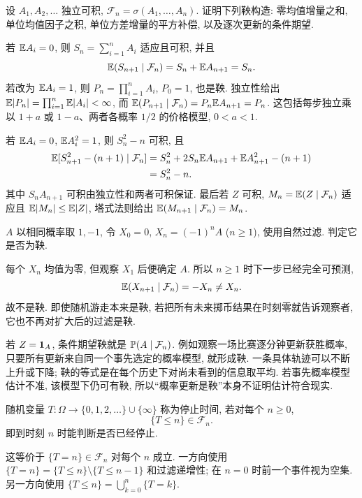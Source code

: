 \begin{example}
设 $A_1,A_2,\ldots$ 独立可积, $\mathcal F_n=\sigma(A_1,\ldots,A_n)$. 证明下列鞅构造: 零均值增量之和, 单位均值因子之积, 单位方差增量的平方补偿, 以及逐次更新的条件期望.
\end{example}
\begin{solution}
若 $\mathbb E A_i=0$, 则 $S_n=\sum_{i=1}^nA_i$ 适应且可积, 并且
\[
 \mathbb E(S_{n+1}\mid\mathcal F_n)=S_n+\mathbb E A_{n+1}=S_n.
\]
若改为 $\mathbb E A_i=1$, 则 $P_n=\prod_{i=1}^nA_i$, $P_0=1$, 也是鞅. 独立性给出 $\mathbb E|P_n|=\prod_{i=1}^n\mathbb E|A_i|<\infty$, 而
$\mathbb E(P_{n+1}\mid\mathcal F_n)=P_n\mathbb E A_{n+1}=P_n$.
这包括每步独立乘以 $1+a$ 或 $1-a$、两者各概率 $1/2$ 的价格模型, $0<a<1$.

若 $\mathbb E A_i=0$, $\mathbb E A_i^2=1$, 则 $S_n^2-n$ 可积, 且
\begin{align*}
 \mathbb E[S_{n+1}^2-(n+1)\mid\mathcal F_n]
 &=S_n^2+2S_n\mathbb E A_{n+1}+\mathbb E A_{n+1}^2-(n+1)\\
 &=S_n^2-n.
\end{align*}
其中 $S_nA_{n+1}$ 可积由独立性和两者可积保证. 最后若 $Z$ 可积, $M_n=\mathbb E(Z\mid\mathcal F_n)$ 适应且
$\mathbb E|M_n|\leq\mathbb E|Z|$, 塔式法则给出
$\mathbb E(M_{n+1}\mid\mathcal F_n)=M_n$.
\end{solution}

\begin{example}
$A$ 以相同概率取 $1,-1$, 令 $X_0=0$, $X_n=(-1)^nA$ ($n\geq1$), 使用自然过滤. 判定它是否为鞅.
\end{example}
\begin{solution}
每个 $X_n$ 均值为零, 但观察 $X_1$ 后便确定 $A$. 所以 $n\geq1$ 时下一步已经完全可预测,
\[
 \mathbb E(X_{n+1}\mid\mathcal F_n)=-X_n\ne X_n.
\]
故不是鞅. 即使随机游走本来是鞅, 若把所有未来掷币结果在时刻零就告诉观察者, 它也不再对扩大后的过滤是鞅.
\end{solution}

若 $Z=\mathbf 1_A$, 条件期望鞅就是 $\mathbb P(A\mid\mathcal F_n)$. 例如观察一场比赛逐分钟更新获胜概率, 只要所有更新来自同一个事先选定的概率模型, 就形成鞅. 一条具体轨迹可以不断上升或下降; 鞅的等式是在每个历史下对尚未看到的信息取平均. 若事先概率模型估计不准, 该模型下仍可有鞅, 所以“概率更新是鞅”本身不证明估计符合现实.

\begin{definition}[停止时间]
随机变量 $T:\Omega\to\{0,1,2,\ldots\}\cup\{\infty\}$ 称为停止时间, 若对每个 $n\geq0$,
\[
 \{T\leq n\}\in\mathcal F_n.
\]
即到时刻 $n$ 时能判断是否已经停止.
\end{definition}
这等价于 $\{T=n\}\in\mathcal F_n$ 对每个 $n$ 成立. 一方向使用
$\{T=n\}=\{T\leq n\}\setminus\{T\leq n-1\}$ 和过滤递增性; 在 $n=0$ 时前一个事件视为空集. 另一方向使用
$\{T\leq n\}=\bigcup_{k=0}^n\{T=k\}$.

